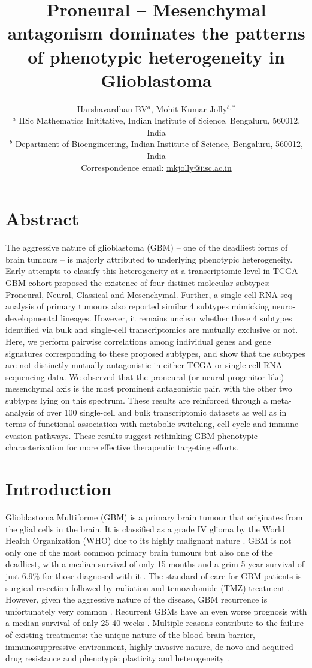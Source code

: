 \documentclass[11pt,a4paper]{article}
\title{Proneural – Mesenchymal antagonism dominates the patterns of phenotypic heterogeneity in Glioblastoma}
\author{Harshavardhan BV$^{a}$, Mohit Kumar Jolly$^{b,*}$
\\
{\scriptsize $^{a}$ IISc Mathematics Inititative, Indian Institute of Science, Bengaluru, 560012, India}\\
{\scriptsize $^{b}$ Department of Bioengineering, Indian Institute of Science, Bengaluru, 560012, India}\\
\scriptsize{Correspondence email: \href{mailto:mkjolly@iisc.ac.in}{mkjolly@iisc.ac.in}} }
\date{}
\begin{document}
\maketitle

\section{Abstract}
The aggressive nature of glioblastoma (GBM) – one of the deadliest forms of brain tumours – is majorly attributed to underlying phenotypic heterogeneity. Early attempts to classify this heterogeneity at a transcriptomic level in TCGA GBM cohort proposed the existence of four distinct molecular subtypes: Proneural, Neural, Classical and Mesenchymal. Further, a single-cell RNA-seq analysis of primary tumours also reported similar 4 subtypes mimicking neuro-developmental lineages. However, it remains unclear whether these 4 subtypes identified via bulk and single-cell transcriptomics are mutually exclusive or not. Here, we perform pairwise correlations among individual genes and gene signatures corresponding to these proposed subtypes, and show that the subtypes are not distinctly mutually antagonistic in either TCGA or single-cell RNA-sequencing data. We observed that the proneural (or neural progenitor-like) – mesenchymal axis is the most prominent antagonistic pair, with the other two subtypes lying on this spectrum. These results are reinforced through a meta-analysis of over 100 single-cell and bulk transcriptomic datasets as well as in terms of functional association with metabolic switching, cell cycle and immune evasion pathways. These results suggest rethinking GBM phenotypic characterization for more effective therapeutic targeting efforts.

\section{Introduction}

Glioblastoma Multiforme (GBM) is a primary brain tumour that originates from the glial cells in the brain. It is classified as a grade IV glioma by the World Health Organization (WHO) due to its highly malignant nature \parencite{who2021}. GBM is not only one of the most common primary brain tumours but also one of the deadliest, with a median survival of only 15 months and a grim 5-year survival of just 6.9\% for those diagnosed with it \parencite{cbtrus, multimodalsurvival}. The standard of care for GBM patients is surgical resection followed by radiation and temozolomide (TMZ) treatment \parencite{gbmsoc}. However, given the aggressive nature of the disease, GBM recurrence is unfortunately very common \parencite{recurr}. Recurrent GBMs have an even worse prognosis with a median survival of only 25-40 weeks \parencite{multimodalsurvival}. Multiple reasons contribute to the failure of existing treatments: the unique nature of the blood-brain barrier, immunosuppressive environment, highly invasive nature, de novo and acquired drug resistance and phenotypic plasticity and heterogeneity \parencite{moleculardrugres, gbmheteroplast}. 
\end{document}

